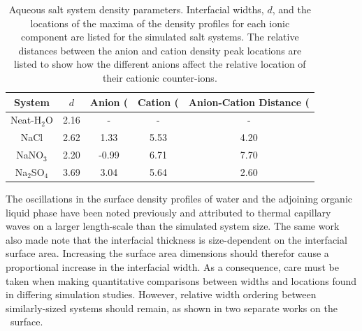 \begin{table}[htdp]
	\begin{center}
	\begin{tabular}{|c||c|c|c|c|}
		\hline
		System & $d$ & Anion (\ang) & Cation (\ang) & Anion-Cation Distance (\ang) \\ \hline
		Neat-H$_2$O & 2.16 & - & - & - \\ 
		NaCl & 2.62 & 1.33 & 5.53 & 4.20 \\
		NaNO$_3$ & 2.20 & -0.99 & 6.71 & 7.70 \\
		Na$_2$SO$_4$ & 3.69 & 3.04 & 5.64 & 2.60 \\
		\hline
	\end{tabular}
	\end{center}
	\caption{Aqueous salt system density parameters. Interfacial widths, $d$, and the locations of the maxima of the density profiles for each ionic component are listed for the simulated salt systems. The relative distances between the anion and cation density peak locations are listed to show how the different anions affect the relative location of their cationic counter-ions.}
	\label{table:double-layer}
\end{table}

The oscillations in the surface density profiles of water and the adjoining organic \ctc liquid phase have been noted previously and attributed to thermal capillary waves on a larger length-scale than the simulated system size.\cite{Chang1996} The same work also made note that the interfacial thickness is size-dependent on the interfacial surface area. Increasing the surface area dimensions should therefor cause a proportional increase in the interfacial width. As a consequence, care must be taken when making quantitative comparisons between widths and locations found in differing simulation studies. However, relative width ordering between similarly-sized systems should remain, as shown in two separate works on the \ctcwat~surface.\cite{Chang1996,Hore2008}

